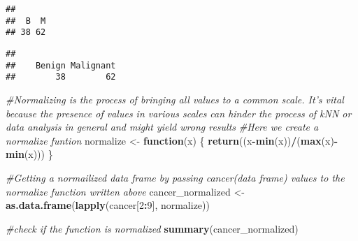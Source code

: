\documentclass[]{article}
\newenvironment{Shaded}{\begin{snugshade}}{\end{snugshade}}
\newcommand{\KeywordTok}[1]{\textcolor[rgb]{0.13,0.29,0.53}{\textbf{#1}}}
\newcommand{\DataTypeTok}[1]{\textcolor[rgb]{0.13,0.29,0.53}{#1}}
\newcommand{\DecValTok}[1]{\textcolor[rgb]{0.00,0.00,0.81}{#1}}
\newcommand{\StringTok}[1]{\textcolor[rgb]{0.31,0.60,0.02}{#1}}
\newcommand{\CommentTok}[1]{\textcolor[rgb]{0.56,0.35,0.01}{\textit{#1}}}
\newcommand{\ControlFlowTok}[1]{\textcolor[rgb]{0.13,0.29,0.53}{\textbf{#1}}}
\newcommand{\OperatorTok}[1]{\textcolor[rgb]{0.81,0.36,0.00}{\textbf{#1}}}
\newcommand{\NormalTok}[1]{#1}
\begin{document}
\begin{verbatim}
## 
##  B  M 
## 38 62
\end{verbatim}

\begin{Shaded}
\end{Shaded}

\begin{verbatim}
## 
##    Benign Malignant 
##        38        62
\end{verbatim}

\begin{Shaded}
\begin{Highlighting}[]
\CommentTok{#Normalizing is the process of bringing all values to a common scale. It's vital because the presence of values in various scales can hinder the process of kNN or data analysis in general and might yield wrong results}
\CommentTok{#Here we create a normalize funtion}
\NormalTok{normalize <-}\StringTok{ }\ControlFlowTok{function}\NormalTok{(x)}
\NormalTok{\{}
  \KeywordTok{return}\NormalTok{((x}\OperatorTok{-}\KeywordTok{min}\NormalTok{(x))}\OperatorTok{/}\NormalTok{(}\KeywordTok{max}\NormalTok{(x)}\OperatorTok{-}\KeywordTok{min}\NormalTok{(x)))}
\NormalTok{\}}


\CommentTok{#Getting a normailized data frame by passing cancer(data frame) values to the normalize function written above}
\NormalTok{cancer_normalized <-}\StringTok{ }\KeywordTok{as.data.frame}\NormalTok{(}\KeywordTok{lapply}\NormalTok{(cancer[}\DecValTok{2}\OperatorTok{:}\DecValTok{9}\NormalTok{], normalize))}

\CommentTok{#check if the function is normalized}
\KeywordTok{summary}\NormalTok{(cancer_normalized)}
\end{Highlighting}
\end{Shaded}
\end{document}
